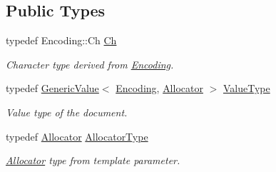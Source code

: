 \subsection*{Public Types}
\begin{DoxyCompactItemize}
\item 
typedef Encoding\+::\+Ch \mbox{\hyperlink{classrapidjson_1_1_generic_document_a8367a827588dd91d02e21ef945bec9f5}{Ch}}
\begin{DoxyCompactList}\small\item\em Character type derived from \mbox{\hyperlink{classrapidjson_1_1_encoding}{Encoding}}. \end{DoxyCompactList}\item 
typedef \mbox{\hyperlink{classrapidjson_1_1_generic_value}{Generic\+Value}}$<$ \mbox{\hyperlink{classrapidjson_1_1_encoding}{Encoding}}, \mbox{\hyperlink{classrapidjson_1_1_allocator}{Allocator}} $>$ \mbox{\hyperlink{classrapidjson_1_1_generic_document_a41bbec044c421e870a9d355075d741bc}{Value\+Type}}
\begin{DoxyCompactList}\small\item\em Value type of the document. \end{DoxyCompactList}\item 
typedef \mbox{\hyperlink{classrapidjson_1_1_allocator}{Allocator}} \mbox{\hyperlink{classrapidjson_1_1_generic_document_a4c85243a28c9dcf2d1357da00fcaa773}{Allocator\+Type}}
\begin{DoxyCompactList}\small\item\em \mbox{\hyperlink{classrapidjson_1_1_allocator}{Allocator}} type from template parameter. \end{DoxyCompactList}\end{DoxyCompactItemize}

